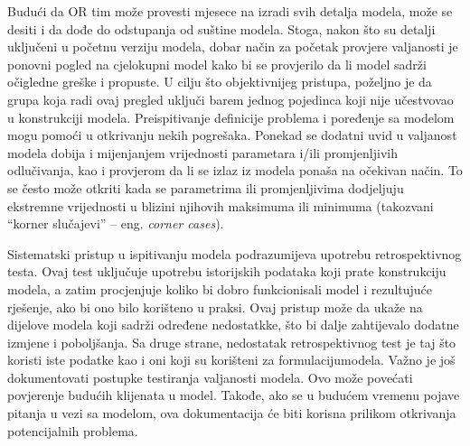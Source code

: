 \documentclass[a4paper, utf8, 11pt, colorlinks]{book}
\theoremstyle{definition}
\begin{document}
Budući da OR tim može provesti mjesece na izradi svih detalja modela, može se desiti i da dođe do odstupanja od suštine modela. Stoga, nakon što su detalji uključeni u 
početnu verziju modela, dobar način za početak provjere valjanosti je ponovni pogled na cjelokupni model kako bi se provjerilo da li model sadrži  očigledne greške i propuste. U cilju što objektivnijeg pristupa, poželjno je da grupa koja radi ovaj pregled uključi barem jednog pojedinca koji nije učestvovao u konstrukciji modela. Preispitivanje definicije
problema i poređenje sa modelom mogu pomoći u otkrivanju nekih pogrešaka.  Ponekad se  dodatni uvid u valjanost modela dobija i 
mijenjanjem vrijednosti parametara i/ili promjenljivih odlučivanja, kao i provjerom da li se  izlaz iz modela ponaša na očekivan način. To se često može otkriti kada se parametrima ili promjenljivima dodjeljuju ekstremne vrijednosti u blizini njihovih maksimuma ili minimuma (takozvani ``korner slučajevi'' -- eng. \textit{corner cases}). 

Sistematski pristup u ispitivanju modela podrazumijeva upotrebu retrospektivnog testa. Ovaj test uključuje upotrebu istorijskih podataka koji prate konstrukciju modela, a zatim procjenjuje koliko bi dobro funkcionisali model i rezultujuće rješenje, ako bi ono  bilo korišteno u praksi.  Ovaj pristup može da ukaže na dijelove modela koji sadrži određene nedostatkke, što bi dalje zahtijevalo dodatne izmjene i poboljšanja. 
Sa druge strane, nedostatak retrospektivnog test je taj što koristi iste podatke kao i oni koji su korišteni za formulacijumodela. %
Važno je još dokumentovati postupke testiranja valjanosti modela. Ovo može  povećati povjerenje budućih klijenata u model. Takođe, ako se u budućem vremenu pojave pitanja u vezi sa modelom, ova dokumentacija će  biti korisna prilikom otkrivanja potencijalnih problema. 

\end{document}
